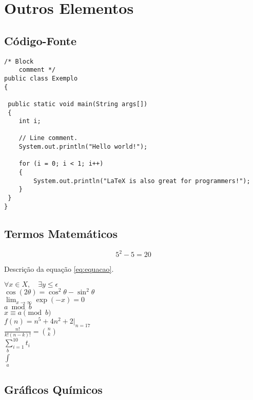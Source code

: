\documentclass[12pt,openright,oneside,a4paper,english,french,spanish,brazil]{unifil}
\begin{document}
\chapter{Outros Elementos}

\section{Código-Fonte}
\begin{lstlisting}
/* Block
    comment */
public class Exemplo
{

 public static void main(String args[])
 {
    int i;
 
    // Line comment.
    System.out.println("Hello world!");
 
    for (i = 0; i < 1; i++)
    {
        System.out.println("LaTeX is also great for programmers!");
    }
 }
}
\end{lstlisting}

\section{Termos Matemáticos}

\begin{equation} 
\label{eq:equacao} %
5^2 - 5 = 20
\end{equation}

Descrição da equação \ref{eq:equacao}.

\noindent $\forall x \in X, \quad \exists y \leq \epsilon$
\\
$\cos (2\theta) = \cos^2 \theta - \sin^2 \theta$
\\
$\lim_{x \to \infty} \exp(-x) = 0$
\\
$a \bmod b$
\\
$x \equiv a \pmod b$
\\
$f(n) = n^5 + 4n^2 + 2 |_{n=17}$
\\
$\frac{n!}{k!(n-k)!} = \binom{n}{k}$
\\
$\sum_{i=1}^{10} t_i$
\\
$\int\limits_a^b$

\section{Gráficos Químicos}

 \\
\end{document}
